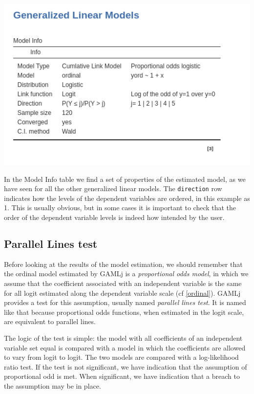 \documentclass[
]{book}
\begin{document}
\includegraphics[width=6.6in]{bookletpics/3_ordinal_output1}

In the {Model Info} table we find a set of properties of the estimated model, as we have seen for all the other generalized linear models. The \texttt{direction} row indicates how the levels of the dependent variables are ordered, in this example as 1. This is usually obvious, but in some cases it is important to check that the order of the dependent variable levels is indeed how intended by the user.

\hypertarget{parallellines}{%
\subsection{Parallel Lines test}\label{parallellines}}

Before looking at the results of the model estimation, we should remember that the ordinal model estimated by {GAMLj} is a \emph{proportional odds model}, in which we assume that the coefficient associated with an independent variable is the same for all logit estimated along the dependent variable scale (cf \ref{ordinal}). {GAMLj} provides a test for this assumption, usually named \emph{parallel lines test}. It is named like that because proportional odds functions, when estimated in the logit scale, are equivalent to parallel lines.

The logic of the test is simple: the model with all coefficients of an independent variable set equal is compared with a model in which the coefficients are allowed to vary from logit to logit. The two models are compared with a log-likelihood ratio test. If the test is not significant, we have indication that the assumption of proportional odd is met. When significant, we have indication that a breach to the assumption may be in place.
\end{document}
